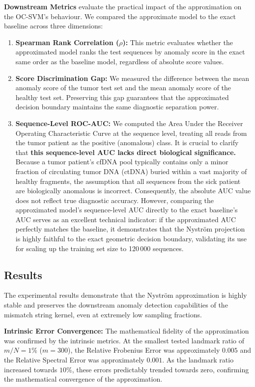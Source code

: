 \textbf{Downstream Metrics} evaluate the practical impact of the approximation on the OC-SVM's behaviour. We compared the approximate model to the exact baseline across three dimensions:
\begin{enumerate}
    \item \textbf{Spearman Rank Correlation ($\rho$):} This metric evaluates whether the approximated model ranks the test sequences by anomaly score in the exact same order as the baseline model, regardless of absolute score values.
    \item \textbf{Score Discrimination Gap:} We measured the difference between the mean anomaly score of the tumor test set and the mean anomaly score of the healthy test set. Preserving this gap guarantees that the approximated decision boundary maintains the same diagnostic separation power.
    \item \textbf{Sequence-Level ROC-AUC:} We computed the Area Under the Receiver Operating Characteristic Curve at the sequence level, treating all reads from the tumor patient as the positive (anomalous) class. It is crucial to clarify that \textbf{this sequence-level AUC lacks direct biological significance.} 
    Because a tumor patient's cfDNA pool typically contains only a minor fraction of circulating tumor DNA (ctDNA) buried within a vast majority of healthy fragments, the assumption that all sequences from the sick patient are biologically anomalous is incorrect. 
    Consequently, the absolute AUC value does not reflect true diagnostic accuracy. However, comparing the approximated model's sequence-level AUC directly to the exact baseline's AUC serves as an excellent technical indicator: if the approximated AUC perfectly matches the baseline, it demonstrates that the Nystr\"{o}m projection is highly faithful to the exact geometric decision boundary, validating its use for scaling up the training set size to 120\,000 sequences.
\end{enumerate}

\subsection{Results}\label{sec:nystrom-results}

The experimental results demonstrate that the Nystr\"{o}m approximation is highly stable and preserves the downstream anomaly detection capabilities of the mismatch string kernel, even at extremely low sampling fractions.

\textbf{Intrinsic Error Convergence:} The mathematical fidelity of the approximation was confirmed by the intrinsic metrics. At the smallest tested landmark ratio of $m/N = 1\%$ ($m=300$), the Relative Frobenius Error was approximately $0.005$ and the Relative Spectral Error was approximately $0.001$. As the landmark ratio increased towards $10\%$, these errors predictably trended towards zero, confirming the mathematical convergence of the approximation.

